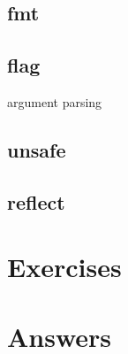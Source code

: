 \subsection{fmt}

\subsection{flag}
argument parsing

\subsection{unsafe}

\subsection{reflect}

\section{Exercises}


\cleardoublepage
\section{Answers}
\shipoutAnswer
